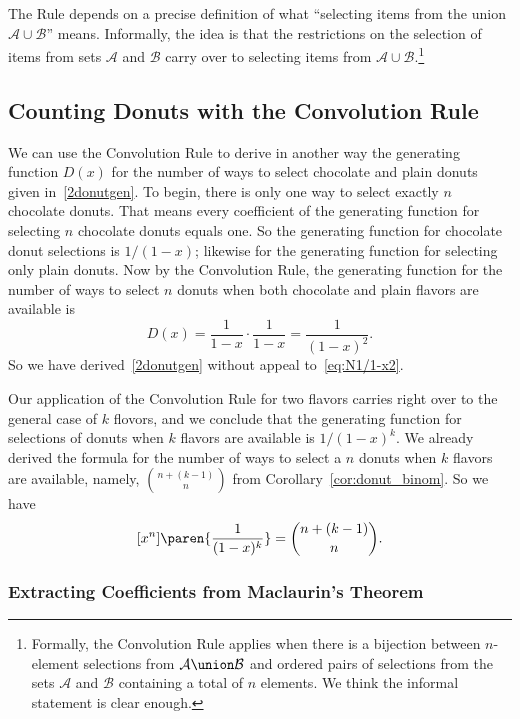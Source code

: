 The Rule depends on a precise definition of what ``selecting items
from the union $\mathcal{A} \cup \mathcal{B}$'' means.  Informally,
the idea is that the restrictions on the selection of items from sets
$\mathcal{A}$ and $\mathcal{B}$ carry over to selecting items from
$\mathcal{A} \cup \mathcal{B}$.\footnote{Formally, the Convolution
  Rule applies when there is a bijection between $n$-element
  selections from $\mathcal{A} \union \mathcal{B}$ and ordered pairs
  of selections from the sets $\mathcal{A}$ and $\mathcal{B}$
  containing a total of $n$ elements.  We think the informal statement
  is clear enough.}

\subsection{Counting Donuts with the Convolution Rule}

We can use the Convolution Rule to derive in another way the
generating function $D(x)$ for the number of ways to select chocolate
and plain donuts given in~\eqref{2donutgen}.  To begin, there is only
one way to select exactly $n$ chocolate donuts.  That means every
coefficient of the generating function for selecting $n$ chocolate
donuts equals one.  So the generating function for chocolate donut
selections is $1/(1-x)$; likewise for the generating function for
selecting only plain donuts.  Now by the Convolution Rule, the
generating function for the number of ways to select $n$ donuts when
both chocolate and plain flavors are available is
\[
D(x) = \frac{1}{1-x} \cdot \frac{1}{1-x} = \frac{1}{(1-x)^2}.
\]
So we have derived~\eqref{2donutgen} without appeal
to~\eqref{eq:N1/1-x2}.

Our application of the Convolution Rule for two flavors carries right
over to the general case of $k$ flovors, and we conclude that the
generating function for selections of donuts when $k$ flavors are
available is $1/(1-x)^k$.  We already derived the formula for the
number of ways to select a $n$ donuts when $k$ flavors are
available, namely, $\binom{n+(k-1)}{n}$ from
Corollary~\ref{cor:donut_binom}.  So we have
\begin{equation}\label{eq:donut_coefficient}
[x^n]\paren{\frac{1}{(1-x)^k}} = \binom{n+(k-1)}{n}.
\end{equation}


\subsubsection{Extracting Coefficients from Maclaurin's Theorem}

